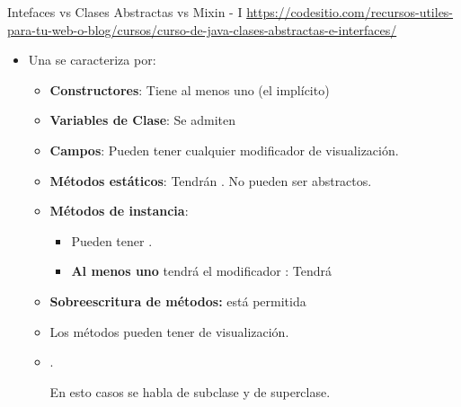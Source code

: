 \documentclass[10pt, envcountsect , spanish]{beamer}
\begin{document}
\begin{frame}{Intefaces vs Clases Abstractas vs Mixin - I}
{\tiny \url{https://codesitio.com/recursos-utiles-para-tu-web-o-blog/cursos/curso-de-java-clases-abstractas-e-interfaces/}} %

\Large

\begin{itemize}
\item Una  se caracteriza por:

\begin{itemize} \large
\item \textbf{Constructores}: Tiene al menos uno (el implícito)
\item \textbf{Variables de Clase}: Se admiten
\item \textbf{Campos}: Pueden tener cualquier modificador de visualización.
\item \textbf{Métodos estáticos}: Tendrán . No pueden ser abstractos. 
\item \textbf{Métodos de instancia}: 
	\begin{itemize} \normalsize
	\item Pueden tener . 
	\item \textbf{Al menos uno} tendrá el modificador : Tendrá 
	\end{itemize}
	
\item \textbf{Sobreescritura de métodos:} está permitida

\item Los métodos pueden tener  de visualización.

\item {}.

\hfil En esto casos se habla de subclase y de superclase.
\end{itemize}

\end{itemize}
\end{frame}
\end{document}
